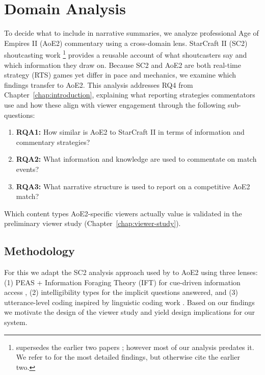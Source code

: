 \chapter{Domain Analysis}\label{chap:prelim}
To decide what to include in narrative summaries, we analyze professional Age of Empires II (AoE2) commentary using a cross-domain lens. StarCraft II (SC2) shoutcasting work \cite{dodge2018, penney2018, penney2021}\footnote{\citet{penney2021} supersedes the earlier two papers \cite{dodge2018, penney2018}; however most of our analysis predates it. We refer to \citet{penney2021} for the most detailed findings, but otherwise cite the earlier two.} provides a reusable account of what shoutcasters say and which information they draw on. Because SC2 and AoE2 are both real-time strategy (RTS) games yet differ in pace and mechanics, we examine which findings transfer to AoE2. This analysis addresses RQ4 from Chapter~\ref{chap:introduction}, explaining what reporting strategies commentators use and how these align with viewer engagement through the following sub-questions:
\begin{enumerate}[noitemsep, topsep=0pt]
  \item \textbf{RQA1:} How similar is AoE2 to StarCraft II in terms of information and commentary strategies?
  \item \textbf{RQA2:} What information and knowledge are used to commentate on match events?
  \item \textbf{RQA3:} What narrative structure is used to report on a competitive AoE2 match?
\end{enumerate}
Which content types AoE2-specific viewers actually value is validated in the preliminary viewer study (Chapter~\ref{chap:viewer-study}).

\section{Methodology}
For this we adapt the SC2 analysis approach used by \citet{dodge2018, penney2018} to AoE2 using three lenses: (1) PEAS + Information Foraging Theory (IFT) for cue-driven information access \cite{russell1995, pirolli1999}, (2) intelligibility types \cite{lim2009} for the implicit questions answered, and (3) utterance-level coding inspired by linguistic coding work \cite{metoyer2010}. Based on our findings we motivate the design of the viewer study and yield design implications for our system.


